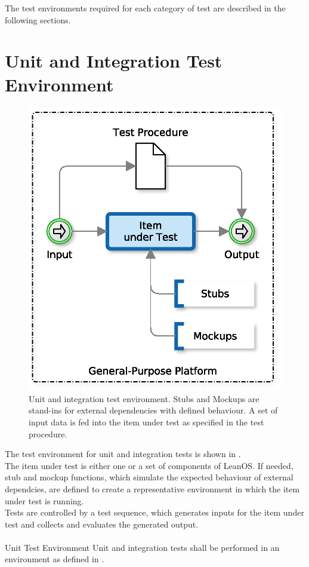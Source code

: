 \noindent
The test environments required for each category of test are described in the
following sections.

\newpage
\section{Unit and Integration Test Environment}

\begin{figure}[]
\begin{center}
	\includegraphics[width=0.5\columnwidth]{images/unittest}
	\caption{Unit and integration test environment. Stubs and Mockups %
	are stand-ins for external dependencies with defined behaviour. %
	A set of input data is fed into the item under test as specified %
	in the test procedure.}
	\label{fig:unittest}
\end{center}
\end{figure}

The test environment for unit and integration tests is shown in
.\\

\noindent
The item under test is either one or a set of components of LeanOS. If needed,
stub and mockup functions, which simulate the expected behaviour of external
dependcies, are defined to create a representative environment in which the item
under test is running.\\

\noindent
Tests are controlled by a test sequence, which generates inputs for the item
under test and collects and evaluates the generated output.\\
\\

 {Unit Test Environment}{%
Unit and integration tests shall be performed in an environment as defined in %
. %
}{}%


